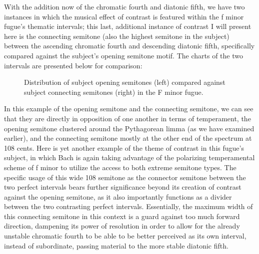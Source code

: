 With the addition now of the chromatic fourth and diatonic fifth, we
have two instances in which the musical effect of contrast is featured
within the f minor fugue's thematic intervals; this last, additional
instance of contrast I will present here is the connecting semitone
(also the highest semitone in the subject) between the ascending
chromatic fourth and descending diatonic fifth, specifically compared
against the subject's opening semitone motif. The charts of the two
intervals are presented below for comparison:



\begin{figure}[H]
\vspace{1.5em}
    \centering
    \caption[Distribution of subject opening semitones compared against subject connecting semitones in the F minor fugue. ]{Distribution of subject opening semitones (left) compared against subject connecting semitones (right) in the F minor fugue.}
\end{figure}    In this example of the opening semitone and the connecting semitone, we
can see that they are directly in opposition of one another in terms of
temperament, the opening semitone clustered around the Pythagorean limma
(as we have examined earlier), and the connecting semitone mostly at the
other end of the spectrum at 108 cents. Here is yet another example of
the theme of contrast in this fugue's subject, in which Bach is again
taking advantage of the polarizing temperamental scheme of f minor to
utilize the access to both extreme semitone types. The specific usage of
this wide 108 semitone as the connector semitone between the two perfect
intervals bears further significance beyond its creation of contrast
against the opening semitone, as it also importantly functions as a
divider between the two contrasting perfect intervals. Essentially, the
maximum width of this connecting semitone in this context is a guard
against too much forward direction, dampening its power of resolution in
order to allow for the already unstable chromatic fourth to be able to
be better perceived as its own interval, instead of subordinate, passing
material to the more stable diatonic fifth.


